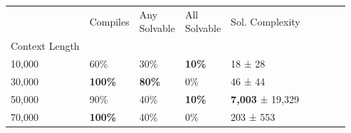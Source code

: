 \begin{tabular}{lllllllll}
\toprule
 & Compiles & \makecell{Any\\Solvable} & \makecell{All\\Solvable} & Sol. Complexity \\
Context Length &  &  &  &   \\
\midrule
10,000 & 60\% & 30\% & \textbf{10\%} & 18 ± 28\\
30,000 & \textbf{100\%} & \textbf{80\%} & 0\% & 46 ± 44 \\
50,000 & 90\% & 40\% & \textbf{10\%} & \textbf{7,003} ± 19,329 \\
70,000 & \textbf{100\%} & 40\% & 0\% & 203 ± 553 \\
\bottomrule
\end{tabular}
